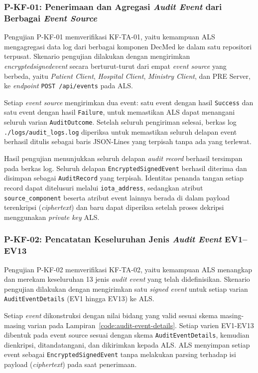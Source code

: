 \subsubsection{P-KF-01: Penerimaan dan Agregasi \textit{Audit Event} dari Berbagai \textit{Event Source}}

Pengujian P-KF-01 memverifikasi KF-TA-01, yaitu kemampuan ALS mengagregasi data log dari berbagai komponen DecMed ke dalam satu repositori terpusat. Skenario pengujian dilakukan dengan mengirimkan \textit{encryptedsignedevent} secara berturut-turut dari empat \textit{event source} yang berbeda, yaitu \textit{Patient Client}, \textit{Hospital Client}, \textit{Ministry Client}, dan PRE Server, ke \textit{endpoint} \texttt{POST /api/events} pada ALS.

Setiap \textit{event source} mengirimkan dua event: satu event dengan hasil \texttt{Success} dan satu event dengan hasil \texttt{Failure}, untuk memastikan ALS dapat menangani seluruh varian \texttt{AuditOutcome}. Setelah seluruh pengiriman selesai, berkas log \texttt{./logs/audit\_logs.log} diperiksa untuk memastikan seluruh delapan event berhasil ditulis sebagai baris JSON-Lines yang terpisah tanpa ada yang terlewat.

Hasil pengujian menunjukkan seluruh delapan \textit{audit record} berhasil tersimpan pada berkas log. Seluruh delapan \texttt{EncryptedSignedEvent} berhasil diterima dan disimpan sebagai \texttt{AuditRecord} yang terpisah. Identitas penanda tangan setiap record dapat ditelusuri melalui \texttt{iota\_address}, sedangkan atribut \texttt{source\_component} beserta atribut event lainnya berada di dalam payload terenkripsi (\textit{ciphertext}) dan baru dapat diperiksa setelah proses dekripsi menggunakan \textit{private key} ALS.

\subsubsection{P-KF-02: Pencatatan Keseluruhan Jenis \textit{Audit Event} EV1--EV13}

Pengujian P-KF-02 memverifikasi KF-TA-02, yaitu kemampuan ALS menangkap dan merekam keseluruhan 13 jenis \textit{audit event} yang telah didefinisikan. Skenario pengujian dilakukan dengan mengirimkan satu \textit{signed event} untuk setiap varian \texttt{AuditEventDetails} (EV1 hingga EV13) ke ALS.

Setiap \textit{event} dikonstruksi dengan nilai bidang yang valid sesuai skema masing-masing varian pada Lampiran~\ref{code:audit-event-details}. Setiap varien EV1-EV13 dibentuk pada event source sesuai dengan skema \texttt{AuditEventDetails}, kemudian dienkripsi, ditandatangani, dan dikirimkan kepada ALS. ALS menyimpan setiap event sebagai \texttt{EncryptedSignedEvent} tanpa melakukan parsing terhadap isi payload (\textit{ciphertext}) pada saat penerimaan.

